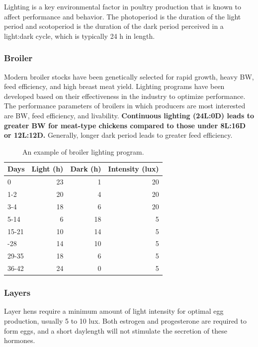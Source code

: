 \documentclass[]{book}
\begin{document}
Lighting is a key environmental factor in poultry production that is
known to affect performance and behavior. The photoperiod is the
duration of the light period and scotoperiod is the duration of the dark
period perceived in a light:dark cycle, which is typically 24 h in
length.

\subsubsection{Broiler}\label{broiler}

Modern broiler stocks have been genetically selected for rapid growth,
heavy BW, feed efficiency, and high breast meat yield. Lighting programs
have been developed based on their effectiveness in the industry to
optimize performance. The performance parameters of broilers in which
producers are most interested are BW, feed efficiency, and livability.
\textbf{Continuous lighting (24L:0D) leads to greater BW for meat-type
chickens compared to those under 8L:16D or 12L:12D.} Generally, longer
dark period leads to greater feed efficiency.

\begin{table}[t]

\caption{\label{tab:lightening}An example of broiler lighting program.}
\centering
\begin{tabular}{lrrr}
\toprule
Days & Light (h) & Dark (h) & Intensity (lux)\\
\midrule
0 & 23 & 1 & 20\\
1-2 & 20 & 4 & 20\\
3-4 & 18 & 6 & 20\\
5-14 & 6 & 18 & 5\\
15-21 & 10 & 14 & 5\\
\addlinespace
22-28 & 14 & 10 & 5\\
29-35 & 18 & 6 & 5\\
36-42 & 24 & 0 & 5\\
\bottomrule
\end{tabular}
\end{table}

\subsubsection{Layers}\label{layers}

Layer hens require a minimum amount of light intensity for optimal egg
production, usually 5 to 10 lux. Both estrogen and progesterone are
required to form eggs, and a short daylength will not stimulate the
secretion of these hormones.
\end{document}
